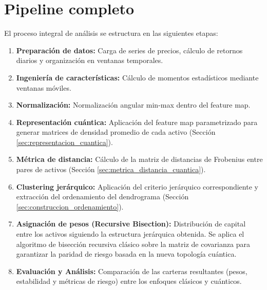 \section{Pipeline completo}
\label{sec:pipeline_completo}

El proceso integral de análisis se estructura en las siguientes etapas:

\begin{enumerate}
    \item \textbf{Preparación de datos:} Carga de series de precios, cálculo de retornos diarios y organización en ventanas temporales.
    \item \textbf{Ingeniería de características:} Cálculo de momentos estadísticos mediante ventanas móviles.
    \item \textbf{Normalización:} Normalización angular min-max dentro del feature map.
    \item \textbf{Representación cuántica:} Aplicación del feature map parametrizado para generar matrices de densidad promedio de cada activo (Sección \ref{sec:representacion_cuantica}).
    \item \textbf{Métrica de distancia:} Cálculo de la matriz de distancias de Frobenius entre pares de activos (Sección \ref{sec:metrica_distancia_cuantica}).
    \item \textbf{Clustering jerárquico:} Aplicación del criterio jerárquico correspondiente y extracción del ordenamiento del dendrograma (Sección \ref{sec:construccion_ordenamiento}).
    \item \textbf{Asignación de pesos (Recursive Bisection):} Distribución de capital entre los activos siguiendo la estructura jerárquica obtenida. Se aplica el algoritmo de bisección recursiva clásico sobre la matriz de covarianza para garantizar la paridad de riesgo basada en la nueva topología cuántica.
    \item \textbf{Evaluación y Análisis:} Comparación de las carteras resultantes (pesos, estabilidad y métricas de riesgo) entre los enfoques clásicos y cuánticos.
\end{enumerate}